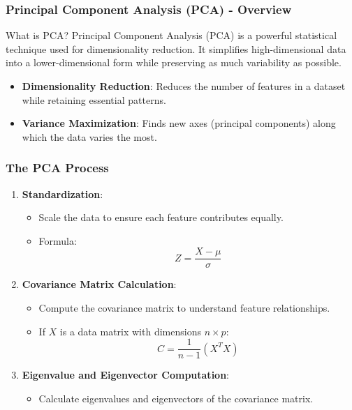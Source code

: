 \documentclass[aspectratio=169]{beamer}
\begin{document}
\begin{frame}[fragile]
    \frametitle{Principal Component Analysis (PCA) - Overview}
    \begin{block}{What is PCA?}
        Principal Component Analysis (PCA) is a powerful statistical technique used for dimensionality reduction. It simplifies high-dimensional data into a lower-dimensional form while preserving as much variability as possible.
    \end{block}
    
    \begin{itemize}
        \item \textbf{Dimensionality Reduction}: Reduces the number of features in a dataset while retaining essential patterns.
        \item \textbf{Variance Maximization}: Finds new axes (principal components) along which the data varies the most.
    \end{itemize}
\end{frame}

\begin{frame}[fragile]
    \frametitle{The PCA Process}
    \begin{enumerate}
        \item \textbf{Standardization}:
            \begin{itemize}
                \item Scale the data to ensure each feature contributes equally.
                \item Formula:
                \begin{equation}
                    Z = \frac{X - \mu}{\sigma}
                \end{equation}
            \end{itemize}

        \item \textbf{Covariance Matrix Calculation}:
            \begin{itemize}
                \item Compute the covariance matrix to understand feature relationships.
                \item If \( X \) is a data matrix with dimensions \( n \times p \):
                \begin{equation}
                    C = \frac{1}{n - 1} (X^T X)
                \end{equation}
            \end{itemize}

        \item \textbf{Eigenvalue and Eigenvector Computation}:
            \begin{itemize}
                \item Calculate eigenvalues and eigenvectors of the covariance matrix.
            \end{itemize}
    \end{enumerate}
\end{frame}
\end{document}

